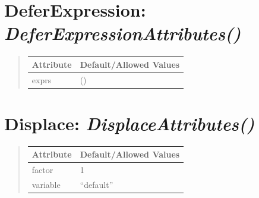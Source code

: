 \documentclass[letterpaper,10pt,english]{sphinxmanual}
\begin{document}
\section{\textbf{DeferExpression}: \emph{DeferExpressionAttributes()}}
\label{attributes:deferexpression-deferexpressionattributes}
\begin{DUlineblock}{0em}
\item[] 
\end{DUlineblock}
\begin{quote}

\begin{tabulary}{\linewidth}{|L|L|}
\hline

\textbf{Attribute}
 & 
\textbf{Default/Allowed Values}
\\
\hline
exprs
 & 
()
\\
\hline\end{tabulary}

\end{quote}

\begin{DUlineblock}{0em}
\item[] 
\end{DUlineblock}

\begin{DUlineblock}{0em}
\item[] 
\end{DUlineblock}


\section{\textbf{Displace}: \emph{DisplaceAttributes()}}
\label{attributes:displace-displaceattributes}
\begin{DUlineblock}{0em}
\item[] 
\end{DUlineblock}
\begin{quote}

\begin{tabulary}{\linewidth}{|L|L|}
\hline

\textbf{Attribute}
 & 
\textbf{Default/Allowed Values}
\\
\hline
factor
 & 
1
\\
\hline
variable
 & 
``default''
\\
\hline\end{tabulary}

\end{quote}

\begin{DUlineblock}{0em}
\item[] 
\end{DUlineblock}
\end{document}
